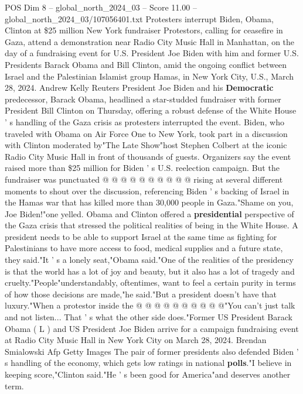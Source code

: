 \begin{textsample}{POS Dim 8 – global\_north\_2024\_03 – Score 11.00 – global\_north\_2024\_03/107056401.txt}  \label{ex:f8_pos_019}
Protesters interrupt Biden, Obama, Clinton at \$25 million New York fundraiser Protestors, calling for ceasefire in Gaza, attend a demonstration near Radio City Music Hall in Manhattan, on the day of a fundraising event for U.S.
President Joe Biden with him and former U.S.
Presidents Barack Obama and Bill Clinton, amid the ongoing conflict between Israel and the Palestinian Islamist group Hamas, in New York City, U.S., March 28, 2024.
Andrew Kelly Reuters President Joe Biden and his \textbf{Democratic} predecessor, Barack Obama, headlined a star-studded fundraiser with former President Bill Clinton on Thursday, offering a robust defense of the White House ' s handling of the Gaza crisis as protesters interrupted the event.
Biden, who traveled with Obama on Air Force One to New York, took part in a discussion with Clinton moderated by"The Late Show"host Stephen Colbert at the iconic Radio City Music Hall in front of thousands of guests.
Organizers say the event raised more than \$25 million for Biden ' s U.S. reelection campaign.
But the fundraiser was punctuated @ @ @ @ @ @ @ @ @ @ rising at several different moments to shout over the discussion, referencing Biden ' s backing of Israel in the Hamas war that has killed more than 30,000 people in Gaza."Shame on you, Joe Biden!"one yelled.
Obama and Clinton offered a \textbf{presidential} perspective of the Gaza crisis that stressed the political realities of being in the White House.
A president needs to be able to support Israel at the same time as fighting for Palestinians to have more access to food, medical supplies and a future state, they said."It ' s a lonely seat,"Obama said."One of the realities of the presidency is that the world has a lot of joy and beauty, but it also has a lot of tragedy and cruelty."People"understandably, oftentimes, want to feel a certain purity in terms of how those decisions are made,"he said."But a president doesn't have that luxury."When a protestor inside the @ @ @ @ @ @ @ @ @ @"You can't just talk and not listen...
That ' s what the other side does."Former US President Barack Obama ( L ) and US President Joe Biden arrive for a campaign fundraising event at Radio City Music Hall in New York City on March 28, 2024.
Brendan Smialowski Afp Getty Images The pair of former presidents also defended Biden ' s handling of the economy, which gets low ratings in national \textbf{polls}."I believe in keeping score,"Clinton said."He ' s been good for America"and deserves another term.

\end{textsample}
